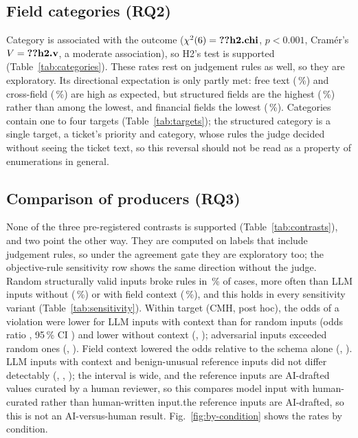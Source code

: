 \documentclass[conference]{IEEEtran}
\begin{document}

\subsection{Field categories (RQ2)}

Category is associated with the outcome ($\chi^2(6)=\R{h2.chi}$, $p<0.001$, Cram\'er's
$V=\R{h2.v}$, a moderate association), so H2's test is supported (Table~\ref{tab:categories}).\ifjudgeweak{}
These rates rest on judgement rules as well, so they are exploratory.\fi{} Its
directional expectation is only partly met: free text (\,\%) and cross-field
(\,\%) are high as expected, but structured fields are the highest
(\,\%) rather than among the lowest, and financial fields the lowest
(\,\%). Categories contain one to four targets (Table~\ref{tab:targets}); the
structured category is a single target, a ticket's priority and category, whose rules the judge
decided without seeing the ticket text, so this reversal should not be read as a property of
enumerations in general.

\subsection{Comparison of producers (RQ3)}

None of the three pre-registered contrasts is supported (Table~\ref{tab:contrasts}), and two point the
other way.\ifjudgeweak{} They are computed on labels that include judgement rules, so under the
agreement gate they are exploratory too; the objective-rule sensitivity row shows the same direction
without the judge.\fi{} Random structurally valid inputs broke rules in \,\% of cases, more often than
LLM inputs without (\,\%) or with field context (\,\%), and this holds in every
sensitivity variant (Table~\ref{tab:sensitivity}). Within target (CMH, post hoc), the odds of a
violation were lower for LLM inputs with context than for random inputs (odds ratio ,
95\,\% CI ) and lower without context (, ); adversarial
inputs exceeded random ones (, ). Field context lowered the odds relative
to the schema alone (, ). LLM inputs with context and benign-unusual
reference inputs did not differ detectably (, , ); the
interval is wide, and \ifreviewed the reference inputs are AI-drafted values curated by a human reviewer,
so this compares model input with human-curated rather than human-written input.\else the reference
inputs are AI-drafted, so this is not an AI-versus-human result.\fi{}
Fig.~\ref{fig:by-condition} shows the rates by condition.
\end{document}
